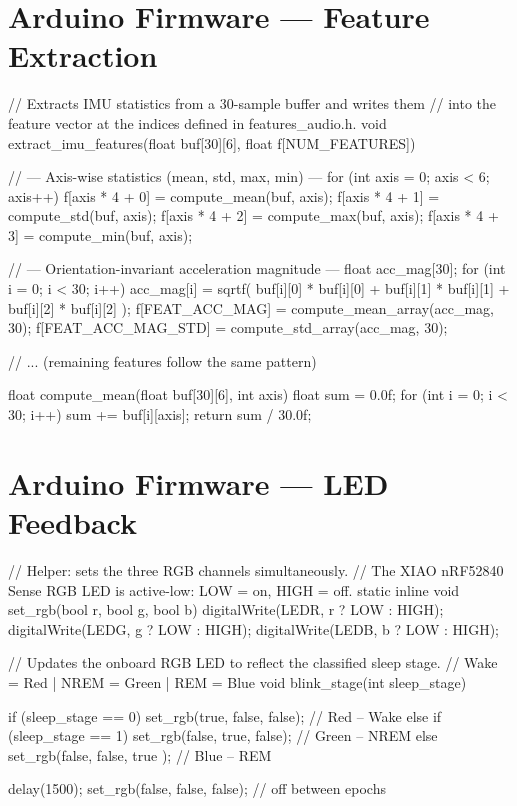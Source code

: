 \section{Arduino Firmware --- Feature Extraction}
\label{app:feature_c}

\begin{ccode}
// Extracts IMU statistics from a 30-sample buffer and writes them
// into the feature vector at the indices defined in features_audio.h.
void extract_imu_features(float buf[30][6], float f[NUM_FEATURES]) {

    // --- Axis-wise statistics (mean, std, max, min) ---
    for (int axis = 0; axis < 6; axis++) {
        f[axis * 4 + 0] = compute_mean(buf, axis);
        f[axis * 4 + 1] = compute_std(buf,  axis);
        f[axis * 4 + 2] = compute_max(buf,  axis);
        f[axis * 4 + 3] = compute_min(buf,  axis);
    }

    // --- Orientation-invariant acceleration magnitude ---
    float acc_mag[30];
    for (int i = 0; i < 30; i++) {
        acc_mag[i] = sqrtf(
            buf[i][0] * buf[i][0] +
            buf[i][1] * buf[i][1] +
            buf[i][2] * buf[i][2]
        );
    }
    f[FEAT_ACC_MAG]     = compute_mean_array(acc_mag, 30);
    f[FEAT_ACC_MAG_STD] = compute_std_array(acc_mag,  30);

    // ... (remaining features follow the same pattern)
}

float compute_mean(float buf[30][6], int axis) {
    float sum = 0.0f;
    for (int i = 0; i < 30; i++) sum += buf[i][axis];
    return sum / 30.0f;
}
\end{ccode}


\section{Arduino Firmware --- LED Feedback}
\label{app:led}

\begin{ccode}
// Helper: sets the three RGB channels simultaneously.
// The XIAO nRF52840 Sense RGB LED is active-low: LOW = on, HIGH = off.
static inline void set_rgb(bool r, bool g, bool b) {
    digitalWrite(LEDR, r ? LOW : HIGH);
    digitalWrite(LEDG, g ? LOW : HIGH);
    digitalWrite(LEDB, b ? LOW : HIGH);
}

// Updates the onboard RGB LED to reflect the classified sleep stage.
// Wake = Red  |  NREM = Green  |  REM = Blue
void blink_stage(int sleep_stage) {
    if      (sleep_stage == 0) set_rgb(true,  false, false);  // Red   -- Wake
    else if (sleep_stage == 1) set_rgb(false, true,  false);  // Green -- NREM
    else                       set_rgb(false, false, true );  // Blue  -- REM

    delay(1500);
    set_rgb(false, false, false);   // off between epochs
}
\end{ccode}


